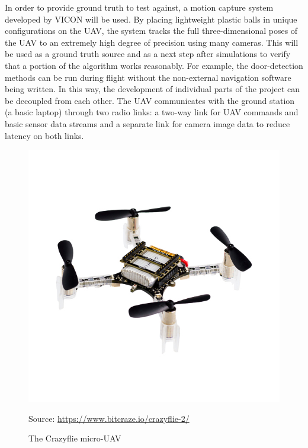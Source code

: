 \documentclass[12pt]{article}
\begin{document}
In order to provide ground truth to test against, a motion capture system developed by VICON will be used. By placing lightweight plastic balls in unique configurations on the UAV, the system tracks the full three-dimensional poses of the UAV to an extremely high degree of precision using many cameras. This will be used as a ground truth source and as a next step after simulations to verify that a portion of the algorithm works reasonably. For example, the door-detection methods can be run during flight without the non-external navigation software being written. In this way, the development of individual parts of the project can be decoupled from each other. The UAV communicates with the ground station (a basic laptop) through two radio links: a two-way link for UAV commands and basic sensor data streams and a separate link for camera image data to reduce latency on both links.

\begin{figure}
	\centering
	\includegraphics[scale=1.7]{crazyflie_new}
	\caption[The Crazyflie micro-UAV]{The Crazyflie micro-UAV}
	\vspace{8pt}
	\small Source: \url{https://www.bitcraze.io/crazyflie-2/}
	\label{crazyflie_image}
\end{figure}
\end{document}
